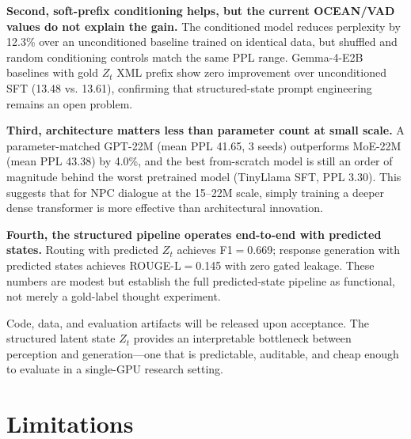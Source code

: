 \documentclass[11pt]{article}
\begin{document}
\textbf{Second, soft-prefix conditioning helps, but the current OCEAN/VAD values do not explain the gain.}
The conditioned model reduces perplexity by 12.3\% over an unconditioned baseline trained on identical data, but shuffled and random conditioning controls match the same PPL range.
Gemma-4-E2B baselines with gold $Z_t$ XML prefix show zero improvement over unconditioned SFT (13.48 vs. 13.61), confirming that structured-state prompt engineering remains an open problem.

\textbf{Third, architecture matters less than parameter count at small scale.}
A parameter-matched GPT-22M (mean PPL 41.65, 3 seeds) outperforms MoE-22M (mean PPL 43.38) by 4.0\%, and the best from-scratch model is still an order of magnitude behind the worst pretrained model (TinyLlama SFT, PPL 3.30).
This suggests that for NPC dialogue at the 15--22M scale, simply training a deeper dense transformer is more effective than architectural innovation.

\textbf{Fourth, the structured pipeline operates end-to-end with predicted states.}
Routing with predicted $Z_t$ achieves F1$=$0.669; response generation with predicted states achieves ROUGE-L$=$0.145 with zero gated leakage.
These numbers are modest but establish the full predicted-state pipeline as functional, not merely a gold-label thought experiment.

Code, data, and evaluation artifacts will be released upon acceptance.
The structured latent state $Z_t$ provides an interpretable bottleneck between perception and generation---one that is predictable, auditable, and cheap enough to evaluate in a single-GPU research setting.

\section*{Limitations}
\label{sec:limitations}
\end{document}
